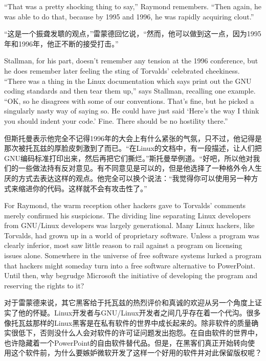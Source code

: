\ifdefined\eng
``That was a pretty shocking thing to say,'' Raymond remembers. ``Then again, he was able to do that, because by 1995 and 1996, he was rapidly acquiring clout.''
\fi

\ifdefined\chs
“这是一个振聋发聩的观点，”雷蒙德回忆说，“然而，他可以做到这一点，因为1995年和1996年，他正不断的接受打击。”
\fi

\ifdefined\eng
Stallman, for his part, doesn't remember any tension at the 1996 conference, but he does remember later feeling the sting of Torvalds' celebrated cheekiness. ``There was a thing in the Linux documentation which says print out the GNU coding standards and then tear them up,'' says Stallman, recalling one example. ``OK, so he disagrees with some of our conventions. That's fine, but he picked a singularly nasty way of saying so. He could have just said `Here's the way I think you should indent your code.' Fine. There should be no hostility there.''
\fi

\ifdefined\chs
但斯托曼表示他完全不记得1996年的大会上有什么紧张的气氛，只不过，他记得是那次被托瓦兹的厚脸皮刺激到了而已。“在Linux的文档中，有一段描述，让人们把GNU编码标准打印出来，然后再把它们撕烂。”斯托曼举例道。“好吧，所以他对我们的一些做法持有反对意见。有不同意见是可以的，但是他选择了一种格外令人生厌的方式去表达这样的观点。他完全可以换个说法：“我觉得你可以使用另一种方式来缩进你的代码。这样就不会有攻击性了。”
\fi

\ifdefined\eng
For Raymond, the warm reception other hackers gave to Torvalds' comments merely confirmed his suspicions. The dividing line separating Linux developers from GNU/Linux developers was largely generational. Many Linux hackers, like Torvalds, had grown up in a world of proprietary software. Unless a program was clearly inferior, most saw little reason to rail against a program on licensing issues alone. Somewhere in the universe of free software systems lurked a program that hackers might someday turn into a free software alternative to PowerPoint. Until then, why begrudge Microsoft the initiative of developing the program and reserving the rights to it?
\fi

\ifdefined\chs
对于雷蒙德来说，其它黑客给于托瓦兹的热烈评价和真诚的欢迎从另一个角度上证实了他的怀疑。Linux开发者与GNU/Linux开发者之间几乎存在着一个代沟。很多像托瓦兹那样的Linux黑客是在私有软件的世界中成长起来的。除非软件的质量确实很低下，否则没什么人会对软件的许可证问题发出抱怨。在自由软件的世界中，也许隐藏着一个PowerPoint的自由软件替代品。但是，在黑客们真正开始转向使用这个软件前，为什么要嫉妒微软开发了这样一个好用的软件并对此保留版权呢？
\fi

